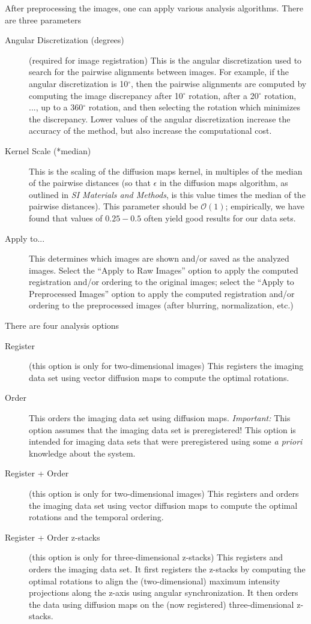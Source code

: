 \documentclass[12pt]{article}
\newcommand{\SI}[0]{\textit{SI Materials and Methods}}
\begin{document}
After preprocessing the images, one can apply various analysis algorithms. 
%
There are three parameters
%
\begin{description}
%
\item[Angular Discretization (degrees)] (required for image registration) This is the angular discretization used to search for the pairwise alignments between images. For example, if the angular discretization is 10$^\circ$, then the pairwise alignments are computed by computing the image discrepancy after 10$^\circ$ rotation, after a 20$^\circ$ rotation, ..., up to a 360$^\circ$ rotation, and then selecting the rotation which minimizes the discrepancy. Lower values of the angular discretization increase the accuracy of the method, but also increase the computational cost. 
%
\item[Kernel Scale (*median)] This is the scaling of the diffusion maps kernel, in multiples of the median of the pairwise distances (so that $\epsilon$ in the diffusion maps algorithm, as outlined in \SI, is this value times the median of the pairwise distances). This parameter should be $\mathcal{O}(1)$; empirically, we have found that values of $0.25-0.5$ often yield good results for our data sets. 
%
\item[Apply to...]  This determines which images are shown and/or saved as the analyzed images. Select the ``Apply to Raw Images'' option to apply the computed registration and/or ordering to the original images; select the ``Apply to Preprocessed Images'' option to apply the computed registration and/or ordering to the preprocessed images (after blurring, normalization, etc.)
%
\end{description}

There are four analysis options
\begin{description}
%
\item[Register] (this option is only for two-dimensional images) This registers the imaging data set using vector diffusion maps to compute the optimal rotations. 
%
\item[Order] This orders the imaging data set using diffusion maps. {\em Important:} This option assumes that the imaging data set is preregistered! This option is intended for imaging data sets that were preregistered using some {\em a priori} knowledge about the system. 
%
\item[Register + Order] (this option is only for two-dimensional images) This registers and orders the imaging data set using vector diffusion maps to compute the optimal rotations and the temporal ordering. 
%
\item[Register + Order z-stacks] (this option is only for three-dimensional z-stacks) This registers and orders the imaging data set. It first registers the z-stacks by computing the optimal rotations to align the (two-dimensional) maximum intensity projections along the z-axis using angular synchronization. It then orders the data using diffusion maps on the (now registered) three-dimensional z-stacks. 
%
\end{description}
\end{document}
